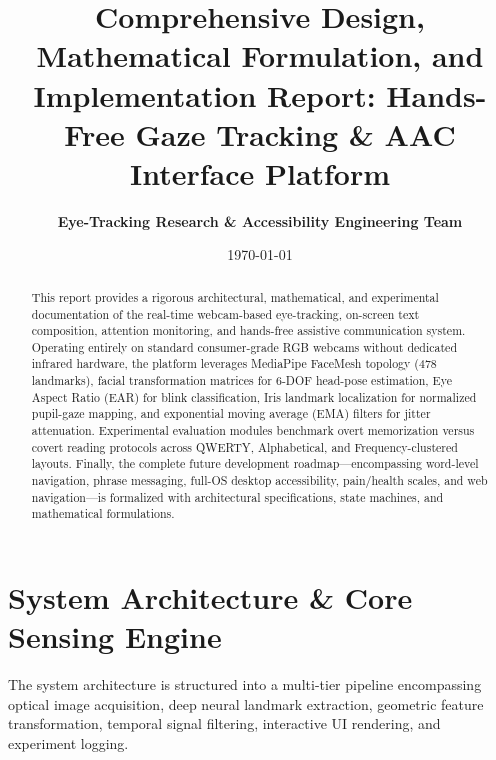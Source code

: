 \documentclass[11pt,a4paper]{article}
\title{\textbf{\LARGE Comprehensive Design, Mathematical Formulation, and Implementation Report: Hands-Free Gaze Tracking \& AAC Interface Platform}}
\author{\textbf{Eye-Tracking Research \& Accessibility Engineering Team}}
\date{\today}
\begin{document}
\maketitle

\begin{abstract}
This report provides a rigorous architectural, mathematical, and experimental documentation of the real-time webcam-based eye-tracking, on-screen text composition, attention monitoring, and hands-free assistive communication system. Operating entirely on standard consumer-grade RGB webcams without dedicated infrared hardware, the platform leverages MediaPipe FaceMesh topology (478 landmarks), facial transformation matrices for 6-DOF head-pose estimation, Eye Aspect Ratio (EAR) for blink classification, Iris landmark localization for normalized pupil-gaze mapping, and exponential moving average (EMA) filters for jitter attenuation. Experimental evaluation modules benchmark overt memorization versus covert reading protocols across QWERTY, Alphabetical, and Frequency-clustered layouts. Finally, the complete future development roadmap—encompassing word-level navigation, phrase messaging, full-OS desktop accessibility, pain/health scales, and web navigation—is formalized with architectural specifications, state machines, and mathematical formulations.
\end{abstract}

\tableofcontents
\newpage

\section{System Architecture \& Core Sensing Engine}

The system architecture is structured into a multi-tier pipeline encompassing optical image acquisition, deep neural landmark extraction, geometric feature transformation, temporal signal filtering, interactive UI rendering, and experiment logging.
\end{document}
